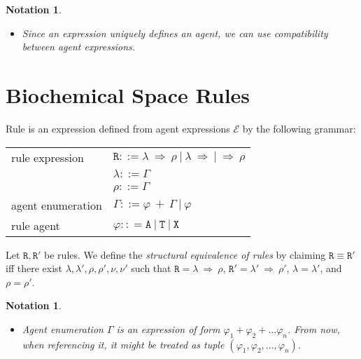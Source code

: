 \documentclass{entcs}
\renewcommand{\~}[0]{\texttildelow}
\newtheorem{notation}[thm]{Notation}
\begin{document}
\begin{notation}
~
\begin{itemize}
\item Since an expression uniquely defines an agent, we can use compatibility between agent expressions.
\end{itemize}
\end{notation}

\section{Biochemical Space Rules}


Rule is an expression defined from agent expressions $\mathcal{E}$ by the following grammar:

\begin{center}
{\small
\hspace*{-1cm}\begin{tabular}{ l l }
 rule expression & $\mathtt{R} ::= \lambda ~\Rightarrow~ \rho ~|~ \lambda ~\Rightarrow ~|~ \Rightarrow~ \rho $\\
  & $\lambda ::= \Gamma$\\
  & $\rho ::= \Gamma$\\
 agent enumeration & $\Gamma ::= \varphi~ +~\Gamma ~|~ \varphi$\\
 rule agent & $\varphi :: = \mathtt{A}~|~\mathtt{T}~|~\mathtt{X}$\\
\end{tabular}
}
\end{center}

\begin{defn}
Let $\mathtt{R},\mathtt{R}'$ be rules. We define the \emph{structural equivalence of rules} by claiming $\mathtt{R} \equiv \mathtt{R}'$ iff there exist $\lambda, \lambda', \rho, \rho', \nu, \nu'$ such that $\mathtt{R}=\lambda ~\Rightarrow~ \rho$, $\mathtt{R}'=\lambda' ~\Rightarrow~ \rho'$, $\lambda=\lambda'$, and $\rho=\rho'$.
\end{defn}

\begin{notation}
~
\begin{itemize}
\item Agent enumeration $\Gamma$ is an expression of form $\varphi_1 + \varphi_2 + ... \varphi_n$. From now, when referencing it, it might be treated as tuple $(\varphi_1, \varphi_2, ..., \varphi_n)$.
\end{itemize}
\end{notation}
\end{document}
